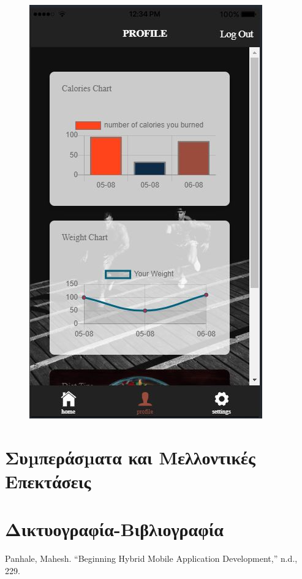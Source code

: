 \documentclass[a4paper,12pt]{article}
\begin{document}
\begin{figure}[!htb]
			  \includegraphics[width=\linewidth]{profile4}
			\endminipage\hfill
		
		\end{figure}

		\newpage
		\section{ Συµπεράσµατα και Μελλοντικές Επεκτάσεις }	
					
		\section{Δικτυογραφία-Βιβλιογραφία}
			Panhale, Mahesh. “Beginning Hybrid Mobile Application Development,” n.d., 229.
\end{document}
